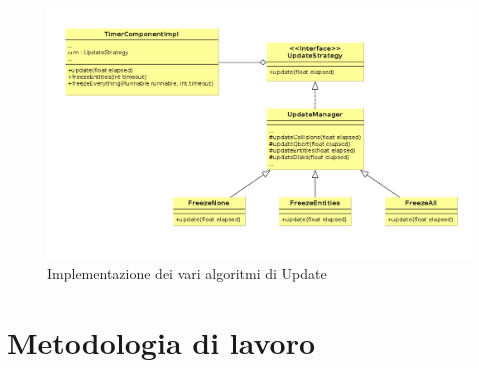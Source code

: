 \documentclass[a4paper,12pt, hidelinks]{report}
\begin{document}
\begin{figure}[H]
\centering{}
\includegraphics[width=\linewidth]{img/UpdateStrategy}
\caption{Implementazione dei vari algoritmi di Update}
\label{img:UpdateStrategy}
\end{figure}

\section{Metodologia di lavoro}
\end{document}
